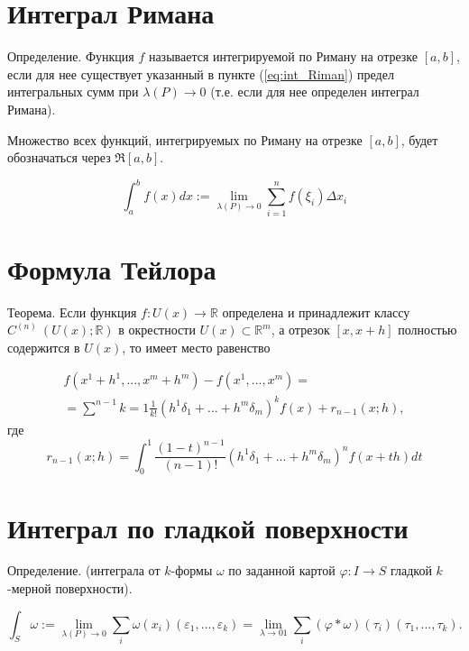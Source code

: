 \documentclass[a4paper, 12pt]{article} %
\begin{document}
\clearpage

\section*{Интеграл Римана}

Определение. Функция $f$ называется интегрируемой по Риману на отрезке $[a, b]$, если для нее существует указанный в пункте (\ref{eq:int_Riman}) предел интегральных сумм при $\lambda (P) \to 0$ (т.е. если для нее определен интеграл Римана).

Множество всех функций, интегрируемых по Риману на отрезке $[a, b]$, будет обозначаться через $\Re [a, b]$.

\[
    \int^b_a f(x) dx := \lim_{\lambda(P) \to 0} \sum^n_{i = 1} f(\xi_i) \Delta x_i
    \label{eq:int_Riman}
\]

\clearpage

\section*{Формула Тейлора}

Теорема. Если функция $f: U(x) \to \mathbb{R}$ определена и принадлежит классу $C^{(n)} \ (U(x); \mathbb{R})$ в окрестности $U(x) \subset \mathbb{R}^m$, а отрезок $[x, x + h]$ полностью содержится в $U(x)$, то имеет место равенство

\begin{eqnarray*}
    f(x^1 + h^1, ..., x^m+h^m) - f(x^1, ...,x^m) = \\ = \sum^{n - 1}{k = 1} \frac{1}{k!} (h^1 \delta_1 + ... + h^m \delta_m)^k f(x) + r_{n - 1}(x; h),
\end{eqnarray*}
где
\begin{equation}
    r_{n-1}(x;h) = \int^1_0 \frac{(1-t)^{n - 1}}{(n - 1)!} (h^1 \delta_1 + ... + h^m \delta_m)^n f(x + th) dt
\end{equation}

\clearpage
\section*{Интеграл по гладкой поверхности}
Определение. (интеграла от $k$-формы $\omega$ по заданной картой $\varphi: I \to S$ гладкой $k$-мерной поверхности).

\[
    \int_S \omega := \lim_{\lambda (P) \to 0} \sum_i \omega (x_i)(\varepsilon_1, ..., \varepsilon_k) = \lim_{\lambda \to 01} \sum_i (\varphi * \omega)(\tau_i)(\tau_1, ..., \tau_k).
    \label{eq:int_by_smooth_surface_one}
\]
\end{document}
